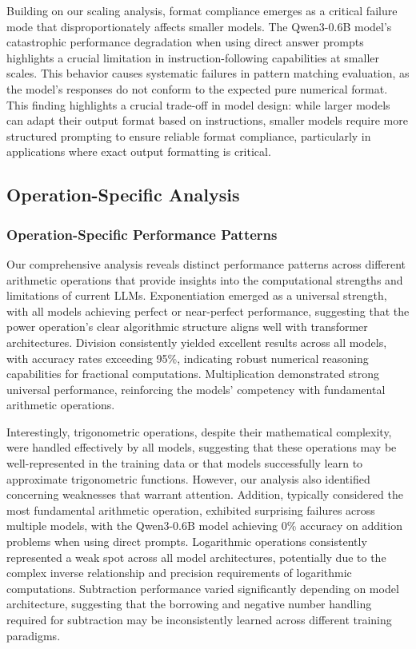 \documentclass{article}
\begin{document}
Building on our scaling analysis, format compliance emerges as a critical failure mode that disproportionately affects smaller models. The Qwen3-0.6B model's catastrophic performance degradation when using direct answer prompts highlights a crucial limitation in instruction-following capabilities at smaller scales. This behavior causes systematic failures in pattern matching evaluation, as the model's responses do not conform to the expected pure numerical format. This finding highlights a crucial trade-off in model design: while larger models can adapt their output format based on instructions, smaller models require more structured prompting to ensure reliable format compliance, particularly in applications where exact output formatting is critical.

\subsection{Operation-Specific Analysis}

\subsubsection{Operation-Specific Performance Patterns}

Our comprehensive analysis reveals distinct performance patterns across different arithmetic operations that provide insights into the computational strengths and limitations of current LLMs. Exponentiation emerged as a universal strength, with all models achieving perfect or near-perfect performance, suggesting that the power operation's clear algorithmic structure aligns well with transformer architectures. Division consistently yielded excellent results across all models, with accuracy rates exceeding 95\%, indicating robust numerical reasoning capabilities for fractional computations. Multiplication demonstrated strong universal performance, reinforcing the models' competency with fundamental arithmetic operations.

Interestingly, trigonometric operations, despite their mathematical complexity, were handled effectively by all models, suggesting that these operations may be well-represented in the training data or that models successfully learn to approximate trigonometric functions. However, our analysis also identified concerning weaknesses that warrant attention. Addition, typically considered the most fundamental arithmetic operation, exhibited surprising failures across multiple models, with the Qwen3-0.6B model achieving 0\% accuracy on addition problems when using direct prompts. Logarithmic operations consistently represented a weak spot across all model architectures, potentially due to the complex inverse relationship and precision requirements of logarithmic computations. Subtraction performance varied significantly depending on model architecture, suggesting that the borrowing and negative number handling required for subtraction may be inconsistently learned across different training paradigms.
\end{document}
